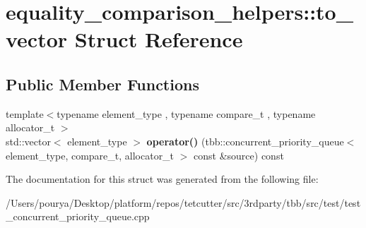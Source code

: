 \hypertarget{structequality__comparison__helpers_1_1to__vector}{}\section{equality\+\_\+comparison\+\_\+helpers\+:\+:to\+\_\+vector Struct Reference}
\label{structequality__comparison__helpers_1_1to__vector}
\subsection*{Public Member Functions}
\begin{DoxyCompactItemize}
\item 
\hypertarget{structequality__comparison__helpers_1_1to__vector_aded54bf4b24d1f685e58aaabb60d3527}{}{\footnotesize template$<$typename element\+\_\+type , typename compare\+\_\+t , typename allocator\+\_\+t $>$ }\\std\+::vector$<$ element\+\_\+type $>$ {\bfseries operator()} (tbb\+::concurrent\+\_\+priority\+\_\+queue$<$ element\+\_\+type, compare\+\_\+t, allocator\+\_\+t $>$ const \&source) const \label{structequality__comparison__helpers_1_1to__vector_aded54bf4b24d1f685e58aaabb60d3527}

\end{DoxyCompactItemize}


The documentation for this struct was generated from the following file\+:\begin{DoxyCompactItemize}
\item 
/\+Users/pourya/\+Desktop/platform/repos/tetcutter/src/3rdparty/tbb/src/test/test\+\_\+concurrent\+\_\+priority\+\_\+queue.\+cpp\end{DoxyCompactItemize}
